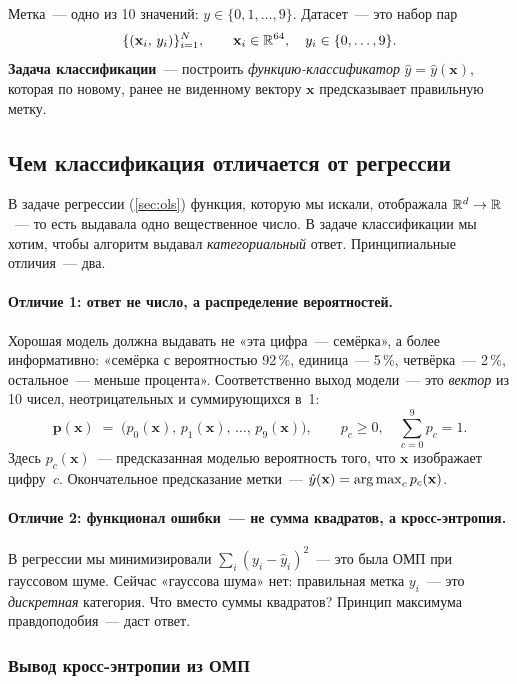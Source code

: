 Метка~--- одно из 10 значений: $y\in\{0,1,\dots,9\}$. Датасет~--- это
набор пар
\[
\{(\mathbf x_i,\,y_i)\}_{i=1}^{N},\qquad
\mathbf x_i\in\mathbb{R}^{64},\quad y_i\in\{0,\dots,9\}.
\]
\textbf{Задача классификации}~--- построить \emph{функцию-классификатор}
$\hat y=\hat y(\mathbf x)$, которая по новому, ранее не виденному вектору
$\mathbf x$ предсказывает правильную метку.

\subsection{Чем классификация отличается от регрессии}
\label{ssec:cls-vs-reg}

В задаче регрессии (\cref{sec:ols}) функция, которую мы искали, отображала
$\mathbb{R}^{d}\to\mathbb{R}$~--- то есть выдавала одно вещественное число. В задаче
классификации мы хотим, чтобы алгоритм выдавал \emph{категориальный}
ответ. Принципиальные отличия~--- два.

\paragraph{Отличие 1: ответ не число, а распределение вероятностей.}
Хорошая модель должна выдавать не «эта цифра~--- семёрка», а более
информативно: «семёрка с вероятностью 92\,\%, единица~--- 5\,\%,
четвёрка~--- 2\,\%, остальное~--- меньше процента». Соответственно
выход модели~--- это \emph{вектор} из 10 чисел, неотрицательных и
суммирующихся в~1:
\[
\mathbf p(\mathbf x) \;=\; \bigl(p_0(\mathbf x),\,p_1(\mathbf x),\,\dots,\,p_9(\mathbf x)\bigr),
\qquad p_c \geq 0,\quad \sum_{c=0}^{9} p_c=1.
\]
Здесь $p_c(\mathbf x)$~--- предсказанная моделью вероятность того, что
$\mathbf x$ изображает цифру~$c$. Окончательное предсказание метки~---
$\hat y(\mathbf x)=\operatorname*{arg\,max}_{c} p_c(\mathbf x)$.

\paragraph{Отличие 2: функционал ошибки~--- не сумма квадратов, а кросс-энтропия.}
В регрессии мы минимизировали $\sum_i (y_i-\hat y_i)^{2}$~--- это была
ОМП при гауссовом шуме. Сейчас «гауссова шума» нет: правильная
метка $y_i$~--- это \emph{дискретная} категория. Что вместо суммы
квадратов? Принцип максимума правдоподобия~--- даст ответ.

\subsubsection*{Вывод кросс-энтропии из ОМП}


